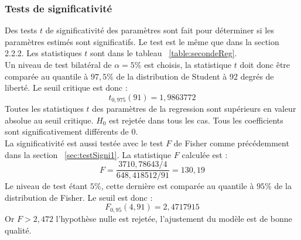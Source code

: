 \documentclass{article}
\begin{document}
\subsubsection{Tests de significativité}
Des tests $t$ de significativité des paramètres sont fait pour déterminer si les paramètres estimés sont significatifs. Le test est le même que dans la
section 2.2.2. Les statistiques $t$ sont dans le tableau ~\ref{table:secondeReg}.
\\
Un niveau de test bilatéral de $\alpha = 5 \%$ est choisis, la statistique  $t$ doit donc être comparée au quantile à  $97,5\%$ de la distribution de
Student à 92 degrés de liberté. Le seuil critique est donc :
\begin{equation*}
t_{0,975}(91) = 1,9863772
\end{equation*}
Toutes les statistiques $t$ des paramètres de la regression sont supérieurs en valeur absolue au seuil critique. $H_0$ est rejetée dans tous les cas.
Tous les coefficients sont significativement différents de 0.
\\
La significativité est aussi testée avec le test $F$ de Fisher comme précédemment dans la section ~\ref{sec:testSigni1}. La statistique $F$ calculée est :
\begin{equation*}
    F =  \frac{3710,78643/4}{648,418512/91} = 130,19
\end{equation*}
Le niveau de test étant $5\%$, cette dernière est comparée au quantile à $95\%$ de la distribution de Fisher. Le seuil est donc :
\begin{equation*}
    F_{0,95}(4,91) = 2,4717915
\end{equation*}
Or $F > 2,472$ l'hypothèse nulle est rejetée, l'ajustement du modèle est de bonne qualité.
\end{document}
